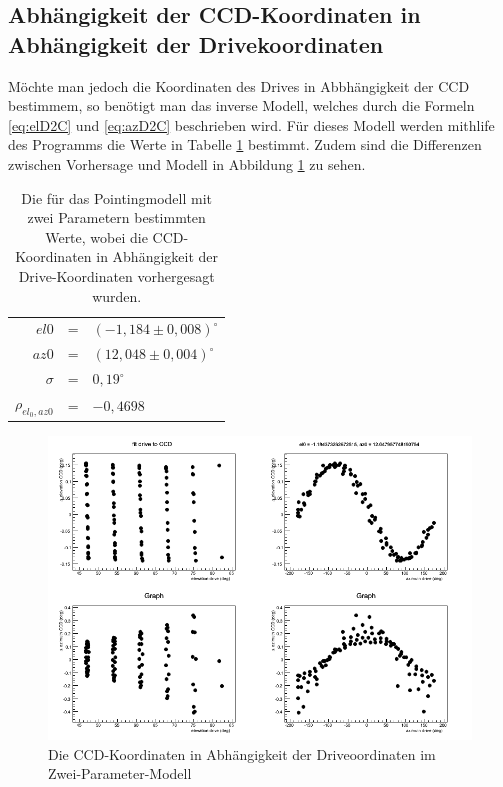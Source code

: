 
\subsection{Abhängigkeit der CCD-Koordinaten in Abhängigkeit der Drivekoordinaten}
Möchte man jedoch die Koordinaten des Drives in Abbhängigkeit der CCD bestimmem, so benötigt man das inverse Modell, welches durch die Formeln \ref{eq:elD2C} und \ref{eq:azD2C} beschrieben wird. Für dieses Modell werden mithlife des Programms die Werte in Tabelle \ref{tab:D2C} bestimmt. Zudem sind die Differenzen zwischen Vorhersage und Modell in Abbildung  \ref{img:D2C} zu sehen.
\begin{table}[htbp]
\centering
\begin{tabular}{rcl}
\toprule
$el0$ &=& $(-1,184\pm0,008)^{\circ}$\\
$az0$ &=& $(12,048\pm0,004)^{\circ}$\\
$\sigma$ &=& $0,19^{\circ}$\\
$\rho_{el_0,az0}$ &=& $-0,4698$\\
\bottomrule
\end{tabular}
\label{tab:D2C}
\caption{Die für das Pointingmodell mit zwei Parametern bestimmten Werte, wobei die CCD-Koordinaten in Abhängigkeit der Drive-Koordinaten vorhergesagt wurden.}
\end{table}


\begin{figure}[htbp]
\centering

\includegraphics[width=\textwidth]{../341/run341D2C.png}
\caption{Die CCD-Koordinaten in Abhängigkeit der Driveoordinaten im Zwei-Parameter-Modell}
\label{img:D2C}
\end{figure}

